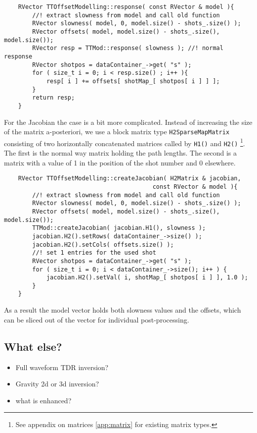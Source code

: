 \begin{lstlisting}
    RVector TTOffsetModelling::response( const RVector & model ){
        //! extract slowness from model and call old function
        RVector slowness( model, 0, model.size() - shots_.size() );
        RVector offsets( model, model.size() - shots_.size(), model.size()); 
        RVector resp = TTMod::response( slowness ); //! normal response
        RVector shotpos = dataContainer_->get( "s" );
        for ( size_t i = 0; i < resp.size() ; i++ ){
            resp[ i ] += offsets[ shotMap_[ shotpos[ i ] ] ];
        }
        return resp;
    }
\end{lstlisting}

For the Jacobian the case is a bit more complicated.
Instead of increasing the size of the matrix a-posteriori, we use a block matrix type \lstinline|H2SparseMapMatrix| consisting of two horizontally concatenated matrices called by \lstinline|H1()| and \lstinline|H2()| \footnote{See appendix on matrices \ref{app:matrix} for existing matrix types.}.
The first is the normal way matrix holding the path lengths.
The second is a matrix with a value of 1 in the position of the shot number and 0 elsewhere.

\begin{lstlisting}
    RVector TTOffsetModelling::createJacobian( H2Matrix & jacobian, 
                                          const RVector & model ){
        //! extract slowness from model and call old function
        RVector slowness( model, 0, model.size() - shots_.size() );
        RVector offsets( model, model.size() - shots_.size(), model.size());
        TTMod::createJacobian( jacobian.H1(), slowness );
        jacobian.H2().setRows( dataContainer_->size() );
        jacobian.H2().setCols( offsets.size() );
        //! set 1 entries for the used shot
        RVector shotpos = dataContainer_->get( "s" );
        for ( size_t i = 0; i < dataContainer_->size(); i++ ) {
            jacobian.H2().setVal( i, shotMap_[ shotpos[ i ] ], 1.0 ); 
        }
    }
\end{lstlisting}

As a result the model vector holds both slowness values and the offsets, which can be sliced out of the vector for individual post-processing.

\subsection{What else?}
\begin{itemize}
	\item Full waveform TDR inversion?
	\item Gravity 2d or 3d inversion?
	\item what is enhanced?
\end{itemize}
